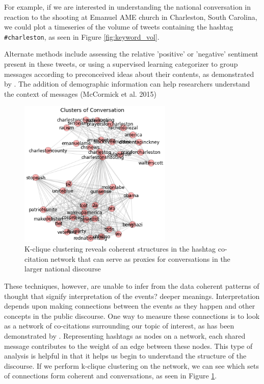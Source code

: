 \documentclass[12pt]{article}
\begin{document}
For example, if we are interested in understanding the national conversation in reaction to the shooting at Emanuel AME church in Charleston, South Carolina, we could plot a timeseries of the volume of tweets containing the hashtag \texttt{\#charleston}, as seen in Figure \ref{fig:keyword_vol}.

Alternate methods include assessing the relative 'positive' or 'negative' sentiment present in these tweets, or using a supervised learning categorizer to group messages according to preconceived ideas about their contents, as demonstrated by \cite{Becker2011,Ritter2010,Zubiaga2011}. 
The addition of demographic information can help researchers understand the context of messages (McCormick et al. 2015)

\begin{figure}[!ht]
  \centering
    \includegraphics[width=0.65\textwidth]{F2_Basic_Clusters.png}
    \caption{K-clique  clustering  reveals  coherent  structures  in the  hashtag  co-citation  network  that  can  serve  as  proxies  for conversations in the larger national discourse}
  \label{fig:basic_clusters}
\end{figure}

These techniques, however, are unable to infer from the data coherent patterns of thought that signify interpretation of the events? deeper meanings. 
Interpretation depends upon making connections between the events as they happen and other concepts in the public discourse. 
One way to measure these connections is to look as a network of co-citations surrounding our topic of interest, as has been demonstrated by \cite{Cogan2012,Smith2014}. 
Representing hashtags as nodes on a network, each shared message contributes to the weight of an edge between these nodes. 
This type of analysis is helpful in that it helps us begin to understand the structure of the discourse. 
If we perform k-clique clustering on the network, we can see which sets of connections form coherent and conversations, as seen in Figure \ref{fig:basic_clusters}.
\end{document}
